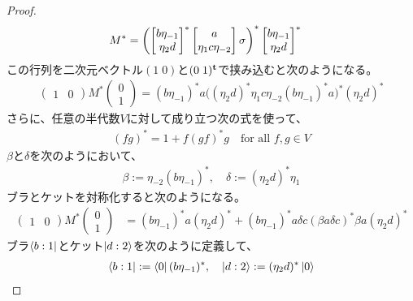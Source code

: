 {\begin{proof}
\begin{equation*}
\begin{split}
			M^* &= \left(
				\begin{bmatrix}{b\eta_{-1}}\\{\eta_2d}\end{bmatrix}^*\begin{bmatrix}{a}\\{\eta_{1}c\eta_{-2}}\end{bmatrix}\sigma
			\right)^*\begin{bmatrix}{b\eta_{-1}}\\{\eta_2d}\end{bmatrix}^*
		\end{split}\end{equation*}
		この行列を二次元ベクトル$(1\;0)$と$(0\;1)^{\mathbf{t}}$で挟み込むと次のようになる。
		\begin{equation*}\begin{split}
			\begin{pmatrix}
				1 & 0
			\end{pmatrix}M^*\begin{pmatrix}
				0 \\ 1
			\end{pmatrix} = (b\eta_{-1})^*a\biggl(
					(\eta_2d)^*\eta_1c\eta_{-2}(b\eta_{-1})^*a
				\biggr)^*(\eta_2d)^*
		\end{split}\end{equation*}
		さらに、任意の半代数$V$に対して成り立つ次の式を使って、
		\begin{equation*}\begin{split}
			(fg)^* = 1 + f(gf)^*g \quad\text{for all } f,g\in V
		\end{split}\end{equation*}
		$\beta$と$\delta$を次のようにおいて、
		\begin{equation*}\begin{split}
			\beta := \eta_{-2}(b\eta_{-1})^*,\quad \delta := (\eta_2d)^*\eta_1
		\end{split}\end{equation*}
		ブラとケットを対称化すると次のようになる。
		\begin{equation}\label{eq:二次元部分の遷移}\begin{split}
			\begin{pmatrix}
				1 & 0
			\end{pmatrix}M^*\begin{pmatrix}
				0 \\ 1
			\end{pmatrix} &= (b\eta_{-1})^*a(\eta_2d)^*
				+ (b\eta_{-1})^*a\delta c(\beta a\delta c)^* \beta a(\eta_2d)^*
		\end{split}\end{equation}
		ブラ$\mathinner{\langle{b:1}|}$とケット$\mathinner{|{d:2}\rangle}$を次のように定義して、
		\begin{equation*}\begin{split}
			\mathinner{\langle{b:1}|} := \mathinner{\langle{0}|}(b\eta_{-1})^*,\quad \mathinner{|{d:2}\rangle} := (\eta_2d)^*\mathinner{|{0}\rangle}
		\end{split}\end{equation*}

\end{proof}}
